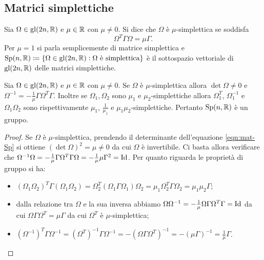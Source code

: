 \subsection{Matrici simplettiche}
\begin{definition}
    Sia $ \Omega \in \mathrm{gl}(2n, \mathbb{R}) $ e $ \mu \in \mathbb{R} $ con $ \mu \neq 0 $. Si dice che $ \Omega $ è $ \mu $-simplettica se soddisfa
    \begin{equation} \label{eqn:mat-Sp}
        \Omega^T \Gamma \Omega = \mu \Gamma.
    \end{equation}
    Per $ \mu = 1 $ si parla semplicemente di matrice simplettica e $ \mathrm{Sp}(n, \mathbb{R}) \coloneqq \{\Omega \in \mathrm{gl}(2n, \mathbb{R}) : \Omega \text{ è simplettica}\} $ è il sottospazio vettoriale di $ \mathrm{gl}(2n, \mathbb{R}) $ delle matrici simplettiche.
\end{definition}

\begin{thm}
    Sia $ \Omega \in \mathrm{gl}(2n, \mathbb{R}) $ e $ \mu \in \mathbb{R} $ con $ \mu \neq 0 $. Se $ \Omega $ è $ \mu $-simplettica allora $ \det{\Omega} \neq 0 $ e $ \Omega^{-1} = - \frac{1}{\mu} \Gamma \Omega^T \Gamma $. Inoltre se $ \Omega_1, \Omega_2 $ sono $ \mu_1 $ e $ \mu_2 $-simplettiche allora $ \Omega_1^T $, $ \Omega_1^{-1} $ e $ \Omega_1 \Omega_2 $ sono rispettivamente $ \mu_1 $, $ \frac{1}{\mu_1} $ e $ \mu_1 \mu_2 $-simplettiche. Pertanto $ \mathrm{Sp}(n, \mathbb{R}) $ è un gruppo.
\end{thm}
\begin{proof}
    Se $ \Omega $ è $ \mu $-simplettica, prendendo il determinante dell'equazione \eqref{eqn:mat-Sp} si ottiene $ (\det{\Omega})^2 = \mu \neq 0 $ da cui $ \Omega $ è invertibile. Ci basta allora verificare che $ \Omega^{-1} \Omega = -\frac{1}{\mu} \Gamma \Omega^T \Gamma \Omega = - \frac{1}{\mu} \mu \Gamma^2 = \mathrm{Id} $. Per quanto riguarda le proprietà di gruppo si ha:
    \begin{itemize}
        \item $ (\Omega_1 \Omega_2)^T \Gamma (\Omega_1 \Omega_2) = \Omega_2^T (\Omega_1 \Gamma \Omega_1) \Omega_2 = \mu_1 \Omega_2^T \Gamma \Omega_2 = \mu_1 \mu_2 \Gamma $;
        \item dalla relazione tra $ \Omega $ e la sua inversa abbiamo $ \Omega \Omega^{-1} = - \frac{1}{\mu} \Omega \Gamma \Omega^T \Gamma = \mathrm{Id} $ da cui $ \Omega \Gamma \Omega^T = \mu \Gamma $ da cui $ \Omega^T $ è $ \mu $-simplettica;
        \item $ (\Omega^{-1})^T \Gamma \Omega^{-1} = (\Omega^T)^{-1} \Gamma \Omega^{-1} = - (\Omega \Gamma \Omega^T)^{-1} = - (\mu \Gamma)^{-1} = \frac{1}{\mu} \Gamma $. \qedhere
    \end{itemize}
\end{proof}

